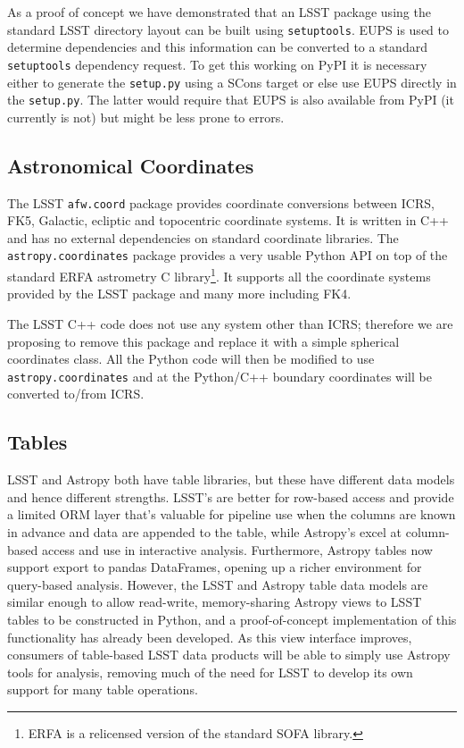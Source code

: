 \documentclass[]{spie}  %
\begin{document}
As a proof of concept we have demonstrated that an LSST package using the standard LSST directory layout can be built using \texttt{setuptools}.
EUPS is used to determine dependencies and this information can be converted to a standard \texttt{setuptools} dependency request.
To get this working on PyPI it is necessary either to generate the \texttt{setup.py} using a SCons target or else use EUPS directly in the \texttt{setup.py}.
The latter would require that EUPS is also available from PyPI (it currently is not) but might be less prone to errors.

\subsection{Astronomical Coordinates}

The LSST \texttt{afw.coord} package provides coordinate conversions between ICRS, FK5, Galactic, ecliptic and topocentric coordinate systems.
It is written in C++ and has no external dependencies on standard coordinate libraries.
The \texttt{astropy.coordinates} package provides a very usable Python API on top of the standard ERFA astrometry C library\footnote{ERFA is a relicensed version of the standard SOFA library\cite{2011SchpJ...611404H}.}.
It supports all the coordinate systems provided by the LSST package and many more including FK4.

The LSST C++ code does not use any system other than ICRS; therefore we are proposing to remove this package and replace it with a simple spherical coordinates class.
All the Python code will then be modified to use \texttt{astropy.coordinates} and at the Python/C++ boundary coordinates will be converted to/from ICRS.

\subsection{Tables}

LSST and Astropy both have table libraries, but these have different data models and hence different strengths.
LSST's are better for row-based access and provide a limited ORM layer that's valuable for pipeline use when the columns are known in advance and data are appended to the table, while Astropy's excel at column-based access and use in interactive analysis.
Furthermore, Astropy tables now support export to pandas DataFrames\cite{mckinney-proc-scipy-2010}, opening up a richer environment for query-based analysis.
However, the LSST and Astropy table data models are similar enough to allow read-write, memory-sharing Astropy views to LSST tables to be constructed in Python, and a proof-of-concept implementation of this functionality has already been developed.
As this view interface improves, consumers of table-based LSST data products will be able to simply use Astropy tools for analysis, removing much of the need for LSST to develop its own support for many table operations.
\end{document}
